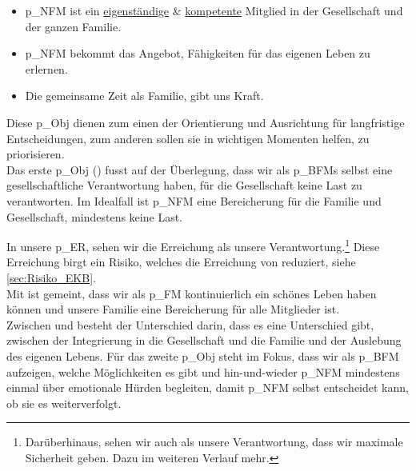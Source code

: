 \begin{itemize}
	\item \gls{p_NFM} ist ein \underline{eigenständige} $\&$ \underline{kompetente} Mitglied in der Gesellschaft und der ganzen Familie. \label{NFM_O_1}
	\item \gls{p_NFM} bekommt das Angebot, Fähigkeiten für das eigenen Leben zu erlernen. \label{NFM_O_2}
	\item Die gemeinsame Zeit als Familie, gibt uns Kraft. \label{NFM_O_3}
\end{itemize}

Diese \gls{p_Obj} dienen zum einen der Orientierung und Ausrichtung für langfristige Entscheidungen, zum anderen sollen sie in wichtigen Momenten helfen, zu priorisieren.\\ 

Das erste \gls{p_Obj} () fusst auf der Überlegung, dass wir als \glspl{p_BFM} selbst eine gesellschaftliche Verantwortung haben, für die Gesellschaft keine Last zu verantworten. Im Idealfall ist \gls{p_NFM} eine Bereicherung für die Familie und Gesellschaft, mindestens keine Last. 

In unsere \gls{p_ER}, sehen wir die Erreichung als unsere Verantwortung.\footnote{
	Darüberhinaus, sehen wir auch als unsere Verantwortung, dass wir maximale Sicherheit geben. Dazu im weiteren Verlauf mehr.
}
Diese Erreichung birgt ein Risiko, welches die Erreichung von  reduziert, siehe \ref{sec:Risiko_EKB}.\\

Mit  ist gemeint, dass wir als \gls{p_FM} kontinuierlich ein schönes Leben haben können und unsere Familie eine Bereicherung für alle Mitglieder ist.\\

Zwischen  und  besteht der Unterschied darin, dass es eine Unterschied gibt, zwischen der Integrierung in die Gesellschaft und die Familie und der Auslebung des eigenen Lebens. Für das zweite \gls{p_Obj} steht im Fokus, dass wir als \gls{p_BFM} aufzeigen, welche Möglichkeiten es gibt und hin-und-wieder \gls{p_NFM} mindestens einmal über emotionale Hürden begleiten, damit \gls{p_NFM} selbst entscheidet kann, ob sie es weiterverfolgt.

